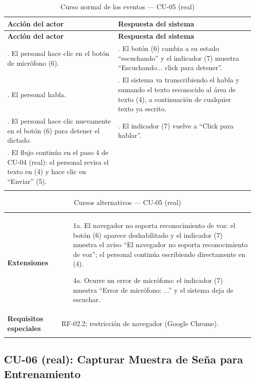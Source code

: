 \setlength{\extrarowheight}{5pt}
\begin{longtable}{@{}>{\raggedright\arraybackslash}p{} >{\raggedright\arraybackslash}p{}@{}}
\toprule
\textbf{Acción del actor} & \textbf{Respuesta del sistema} \\
\midrule
\endfirsthead
\toprule
\textbf{Acción del actor} & \textbf{Respuesta del sistema} \\
\midrule
\endhead
1. El personal hace clic en el botón de micrófono (6). &
2. El botón (6) cambia a su estado ``escuchando'' y el indicador (7)
muestra ``Escuchando... click para detener''. \\
3. El personal habla. &
4. El sistema va transcribiendo el habla y sumando el texto reconocido
al área de texto (4), a continuación de cualquier texto ya escrito. \\
5. El personal hace clic nuevamente en el botón (6) para detener el
dictado. &
6. El indicador (7) vuelve a ``Click para hablar''. \\
7. El flujo continúa en el paso 4 de CU-04 (real): el personal revisa el
texto en (4) y hace clic en ``Enviar'' (5). & \\
\bottomrule
\caption{Curso normal de los eventos --- CU-05 (real)}
\end{longtable}
\setlength{\extrarowheight}{0pt}

\begin{longtable}{@{}p{4.1cm} >{\raggedright\arraybackslash}p{11.2cm}@{}}
\toprule
\textbf{Extensiones} &
\begin{itemize}[leftmargin=*, itemsep=2pt]
    \item[1a.] El navegador no soporta reconocimiento de voz: el botón
    (6) aparece deshabilitado y el indicador (7) muestra el aviso ``El
    navegador no soporta reconocimiento de voz''; el personal continúa
    escribiendo directamente en (4).
    \item[4a.] Ocurre un error de micrófono: el indicador (7) muestra
    ``Error de micrófono: ...'' y el sistema deja de escuchar.
\end{itemize} \\
\textbf{Requisitos especiales} & RF-02.2; restricción de navegador (Google
Chrome). \\
\bottomrule
\caption{Cursos alternativos --- CU-05 (real)}
\end{longtable}

\subsection{CU-06 (real): Capturar Muestra de Seña para Entrenamiento}

